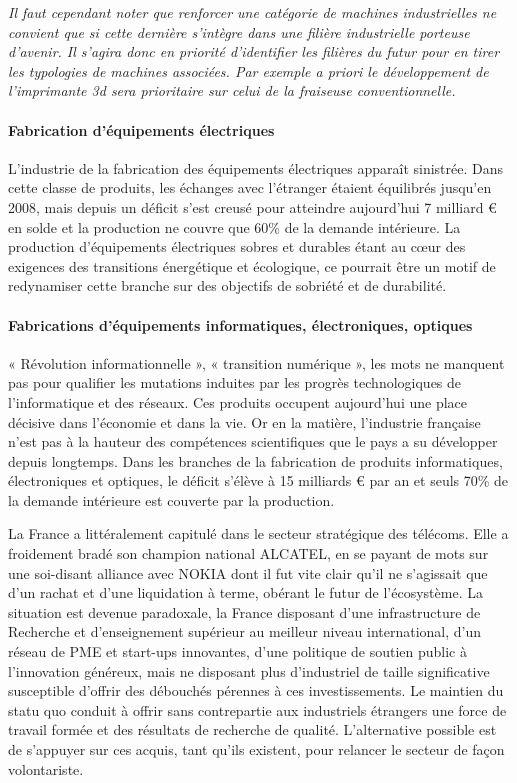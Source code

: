 \documentclass[a4paper]{article}
\begin{document}
\emph{Il faut cependant noter que renforcer une catégorie de machines industrielles ne convient que si cette dernière s'intègre dans une filière industrielle porteuse d’avenir. Il s’agira donc en priorité d’identifier les filières du futur pour en tirer les typologies de machines associées. Par exemple a priori le développement de l'imprimante 3d sera prioritaire sur celui de la fraiseuse conventionnelle.}

\paragraph{Fabrication d’équipements électriques}
L’industrie de la fabrication des équipements électriques apparaît sinistrée.  Dans cette classe de produits, les échanges avec l’étranger étaient équilibrés jusqu’en 2008, mais depuis un déficit s’est creusé pour atteindre aujourd’hui 7 milliard € en solde et la production ne couvre que 60\% de la demande intérieure. La production d’équipements électriques sobres et durables étant au cœur des exigences des transitions énergétique et écologique, ce pourrait être un motif de redynamiser cette branche sur des objectifs de sobriété et de durabilité.

\paragraph{Fabrications d’équipements informatiques, électroniques, optiques}
« Révolution informationnelle », « transition numérique », les mots ne manquent pas pour qualifier les mutations induites par les progrès technologiques de l’informatique et des réseaux. Ces produits occupent aujourd’hui une place décisive dans l’économie et dans la vie. Or en la matière, l’industrie française n’est pas à la hauteur des compétences scientifiques que le pays a su développer depuis longtemps. Dans les branches de la fabrication de produits informatiques, électroniques et optiques, le déficit s’élève à 15 milliards € par an et seuls 70\% de la demande intérieure est couverte par la production. 

La France a littéralement capitulé dans le secteur stratégique des télécoms. Elle a froidement bradé son champion national ALCATEL, en se payant de mots sur une soi-disant alliance avec NOKIA dont il fut vite clair qu’il ne s’agissait que d’un rachat et d’une liquidation à terme, obérant le futur de l’écosystème. La situation est devenue paradoxale, la France disposant d’une infrastructure de Recherche et d’enseignement supérieur au meilleur niveau international, d’un réseau de PME et start-ups innovantes, d’une politique de soutien public à l’innovation généreux, mais ne disposant plus d’industriel de taille significative susceptible d’offrir des débouchés pérennes à ces investissements. Le maintien du statu quo conduit à offrir sans contrepartie aux industriels étrangers une force de travail formée et des résultats de recherche de qualité. L’alternative possible est de s’appuyer sur ces acquis, tant qu’ils existent, pour relancer le secteur de façon volontariste. 
\end{document}
